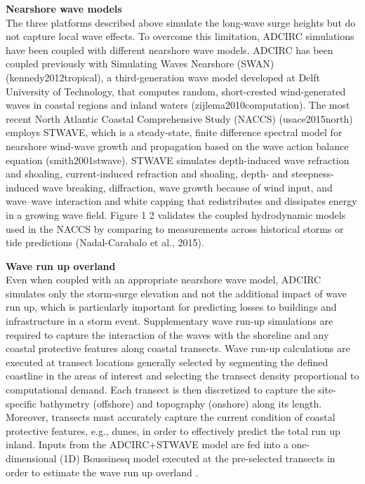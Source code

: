 \noindent\textbf{Nearshore wave models} \\The three platforms described above simulate the long-wave surge heights but do not capture local wave effects. To overcome this limitation, ADCIRC simulations have been coupled with different nearshore wave models. ADCIRC has been coupled previously with Simulating Waves Nearshore (SWAN) (kennedy2012tropical), a third-generation wave model developed at Delft University of Technology, that computes random, short-crested wind-generated waves in coastal regions and inland waters (zijlema2010computation). The most recent North Atlantic Coastal Comprehensive Study (NACCS) (usace2015north) employs STWAVE, which is a steady-state, finite difference spectral model for nearshore wind-wave growth and propagation based on the wave action balance equation (smith2001stwave). STWAVE simulates depth-induced wave refraction and shoaling, current-induced refraction and shoaling, depth- and steepness-induced wave breaking, diffraction, wave growth because of wind input, and wave–wave interaction and white capping that redistributes and dissipates energy in a growing wave field. Figure 1 2 validates the coupled hydrodynamic models used in the NACCS by comparing to measurements across historical storms or tide predictions (Nadal-Carabalo et al., 2015). 
\newline

\noindent\textbf{Wave run up overland} \\Even when coupled with an appropriate nearshore wave model, ADCIRC simulates only the storm-surge elevation and not the additional impact of wave run up, which is particularly important for predicting losses to buildings and infrastructure in a storm event. Supplementary wave run-up simulations are required to capture the interaction of the waves with the shoreline and any coastal protective features along coastal transects. Wave run-up calculations are executed at transect locations generally selected by segmenting the defined coastline in the areas of interest and selecting the transect density proportional to computational demand. Each transect is then discretized to capture the site-specific bathymetry (offshore) and topography (onshore) along its length. Moreover, transects must accurately capture the current condition of coastal protective features, e.g., dunes, in order to effectively predict the total run up inland. Inputs from the ADCIRC+STWAVE model are fed into a one-dimensional (1D) Boussinesq model executed at the pre-selected transects in order to estimate the wave run up overland \citep{demirbilek_2009}. 
\newline

